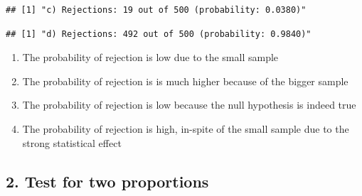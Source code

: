 \documentclass[
]{article}
\newenvironment{Shaded}{\begin{snugshade}}{\end{snugshade}}
\newcommand{\AttributeTok}[1]{\textcolor[rgb]{0.13,0.29,0.53}{#1}}
\newcommand{\ControlFlowTok}[1]{\textcolor[rgb]{0.13,0.29,0.53}{\textbf{#1}}}
\newcommand{\DecValTok}[1]{\textcolor[rgb]{0.00,0.00,0.81}{#1}}
\newcommand{\FloatTok}[1]{\textcolor[rgb]{0.00,0.00,0.81}{#1}}
\newcommand{\FunctionTok}[1]{\textcolor[rgb]{0.13,0.29,0.53}{\textbf{#1}}}
\newcommand{\NormalTok}[1]{#1}
\newcommand{\OtherTok}[1]{\textcolor[rgb]{0.56,0.35,0.01}{#1}}
\newcommand{\SpecialCharTok}[1]{\textcolor[rgb]{0.81,0.36,0.00}{\textbf{#1}}}
\newcommand{\StringTok}[1]{\textcolor[rgb]{0.31,0.60,0.02}{#1}}
\providecommand{\tightlist}{%
  \setlength{\itemsep}{0pt}\setlength{\parskip}{0pt}}
\begin{document}
\begin{verbatim}
## [1] "c) Rejections: 19 out of 500 (probability: 0.0380)"
\end{verbatim}

\begin{Shaded}
\end{Shaded}

\begin{verbatim}
## [1] "d) Rejections: 492 out of 500 (probability: 0.9840)"
\end{verbatim}

\begin{enumerate}
\def\labelenumi{\alph{enumi})}
\tightlist
\item
  The probability of rejection is low due to the small sample
\item
  The probability of rejection is is much higher because of the bigger
  sample
\item
  The probability of rejection is low because the null hypothesis is
  indeed true
\item
  The probability of rejection is high, in-spite of the small sample due
  to the strong statistical effect
\end{enumerate}

\subsection{2. Test for two proportions}\label{test-for-two-proportions}
\end{document}
